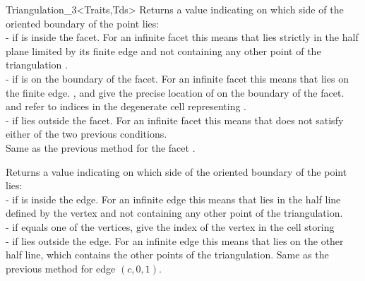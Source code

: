 \begin{ccClassTemplate}{Triangulation_3<Traits,Tds>}
{Returns a value indicating on which side of the oriented boundary
of  the point  lies:\\
-  if  is inside the facet. For an
infinite facet this means that  lies strictly in the half plane
limited by its finite edge and not containing any other point of the
triangulation . \\
-  if  is on the boundary of the facet.
For an infinite facet this means that  lies on the finite
edge. ,  and  give the precise location of
 on the boundary of the facet.  and  refer to
indices in the degenerate cell  representing .\\
-  if  lies outside the facet. For
an infinite facet this means that  does not satisfy either of
the two previous conditions. \\
}
\ccGlue
{}
{Same as the previous method for the facet .}

{Returns a value indicating on which side of the oriented boundary
of  the point  lies:\\
-  if  is inside the edge. For an
infinite edge this means that  lies in the half line defined by
the vertex and not containing any other point of the triangulation.\\ 
-  if  equals one of the vertices,
 give the index of the vertex in the cell storing \\
-  if  lies outside the edge. For
an infinite edge this means that  lies on the other half line,
which contains the other points of the triangulation.
}
\ccGlue
{}
{Same as the previous method for edge $(c,0,1)$.}


\end{ccClassTemplate}
